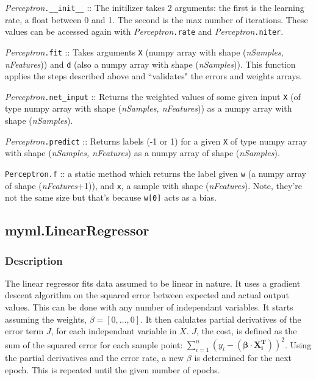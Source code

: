 \documentclass{article}
\begin{document}
\textit{Perceptron}\texttt{.\_\_init\_\_} :: The initilizer takes 2 arguments: the
first is the learning rate, a float between 0 and 1. The second is the max
number of iterations. These values can be accessed again with
\textit{Perceptron}\texttt{.rate} and \textit{Perceptron}\texttt{.niter}.

\textit{Perceptron}\texttt{.fit} :: Takes arguments \texttt{X} (numpy array
with shape (\textit{nSamples}, \textit{nFeatures})) and \texttt{d} (also a
numpy array with shape (\textit{nSamples})). This function applies the steps
described above and ``validates" the errors and weights arrays.

\textit{Perceptron}\texttt{.net\_input} :: Returns the weighted values of some
given input \texttt{X} (of type numpy array with shape
(\textit{nSamples, nFeatures})) as a numpy array with shape (\textit{nSamples}).

\textit{Perceptron}\texttt{.predict} :: Returns labels (-1 or 1) for a given
\texttt{X} of type numpy array with shape (\textit{nSamples, nFeatures}) as a
numpy array of shape (\textit{nSamples}).

\texttt{Perceptron.f} :: a static method which returns the label given
\texttt{w} (a numpy array of shape (\textit{nFeatures}+1)), and \texttt{x}, a
sample with shape (\textit{nFeatures}). Note, they're not the same size but
that's because \texttt{w[0]} acts as a bias.

\subsection{myml.LinearRegressor}

\subsubsection{Description}

The linear regressor fits data assumed to be linear in nature. It uses a gradient
descent algorithm on the squared error between expected and actual output values. This
can be done with any number of independant variables. It starts assuming the weights, $\beta = [0, ..., 0]$.
It then calulates partial derivatives of the error term $J$, for each independant variable in $X$.
$J$, the cost, is defined as the sum of the squared error for each sample point: $\sum_{i=1}^{n}(y_i-(\mathbf{\beta}\cdot\mathbf{X^T_i}))^2$.
Using the partial derivatives and the error rate, a new $\beta$ is determined for
the next epoch. This is repeated until the given number of epochs.
\end{document}
